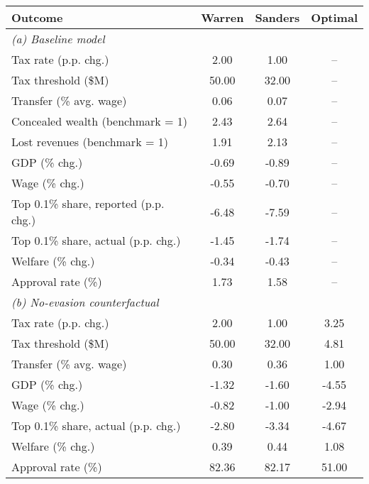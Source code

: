 \footnotesize
\renewcommand{\arraystretch}{1.2}
\begin{tabular}{lccc}
\toprule
Outcome & Warren & Sanders & Optimal\\
\midrule
\multicolumn{4}{l}{\textit{(a) Baseline model}}\\
Tax rate (p.p. chg.)&2.00&1.00&--\\
Tax threshold (\$M)&50.00&32.00&--\\
Transfer (\% avg. wage)&0.06&0.07&--\\
[1.0ex]Concealed wealth (benchmark = 1)&2.43&2.64&--\\
Lost revenues (benchmark = 1)&1.91&2.13&--\\
[1.0ex]GDP (\% chg.)&-0.69&-0.89&--\\
Wage (\% chg.)&-0.55&-0.70&--\\
[1.0ex]Top 0.1\% share, reported (p.p. chg.)&-6.48&-7.59&--\\
Top 0.1\% share, actual (p.p. chg.)&-1.45&-1.74&--\\
[1.0ex]Welfare (\% chg.)&-0.34&-0.43&--\\
Approval rate (\%)&1.73&1.58&--\\
\midrule
\multicolumn{4}{l}{\textit{(b) No-evasion counterfactual}}\\
Tax rate (p.p. chg.)&2.00&1.00&3.25\\
Tax threshold (\$M)&50.00&32.00&4.81\\
Transfer (\% avg. wage)&0.30&0.36&1.00\\
[1.0ex]GDP (\% chg.)&-1.32&-1.60&-4.55\\
Wage (\% chg.)&-0.82&-1.00&-2.94\\
[1.0ex]Top 0.1\% share, actual (p.p. chg.)&-2.80&-3.34&-4.67\\
[1.0ex]Welfare (\% chg.)&0.39&0.44&1.08\\
Approval rate (\%)&82.36&82.17&51.00\\
\bottomrule
\end{tabular}
\normalsize
